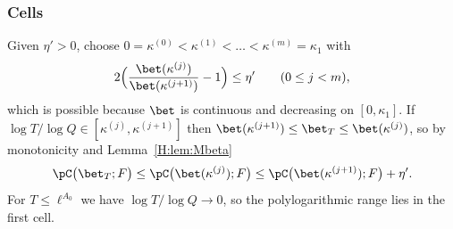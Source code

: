 \subsubsection*{Cells}\label{H:sec:cells}
Given $\eta'>0$, choose $0=\kappa^{(0)}<\kappa^{(1)}<\dots<\kappa^{(m)}=\kappa_1$ with
\begin{equation}\label{H:eq:cells}
2\Big(\frac{\bet(\kappa^{(j)})}{\bet(\kappa^{(j+1)})}-1\Big)\le\eta'\qquad(0\le j<m),
\end{equation}
which is possible because $\bet$ is continuous and decreasing on $[0,\kappa_1]$. If $\log T/\log Q\in[\kappa^{(j)},\kappa^{(j+1)}]$ then $\bet(\kappa^{(j+1)})\le\bet_T\le\bet(\kappa^{(j)})$, so by monotonicity and Lemma~\ref{H:lem:Mbeta}
\begin{equation}\label{H:eq:cellcompare}
\pC\big(\bet_T;F\big)\le\pC\big(\bet(\kappa^{(j)});F\big)\le\pC\big(\bet(\kappa^{(j+1)});F\big)+\eta' .
\end{equation}
For $T\le\ell^{A_0}$ we have $\log T/\log Q\to0$, so the polylogarithmic range lies in the first cell.

